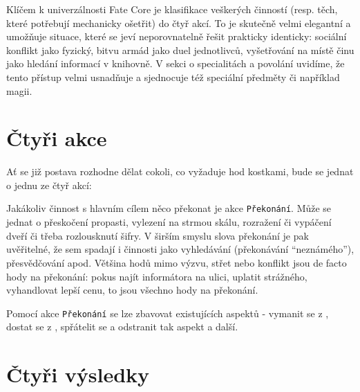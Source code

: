 \documentclass[../main.tex]{subfiles}
\begin{document}
Klíčem k univerzálnosti Fate Core je klasifikace veškerých činností (resp. těch, které potřebují mechanicky ošetřit) do čtyř akcí. To je skutečně velmi elegantní a umožňuje situace, které se jeví neporovnatelně řešit prakticky identicky: sociální konflikt jako fyzický, bitvu armád jako duel jednotlivců, vyšetřování na místě činu jako hledání informací v knihovně. V sekci o specialitách a povolání uvidíme, že tento přístup velmi usnadňuje a sjednocuje též speciální předměty či například magii.

\section{Čtyři akce}
\label{sec:4-akce}

Ať se již postava rozhodne dělat cokoli, co vyžaduje hod kostkami, bude se jednat o jednu ze čtyř akcí:

\begin{akce}
   Jakákoliv činnost s hlavním cílem něco překonat je akce \texttt{Překonání}. Může se jednat o přeskočení propasti, vylezení na strmou skálu, rozražení či vypáčení dveří či třeba rozlousknutí šifry. V širším smyslu slova překonání je pak uvěřitelné, že sem spadají i činnosti jako vyhledávání (překonávání ``neznámého''), přesvědčování apod. Většina hodů mimo výzvu, střet nebo konflikt jsou de facto hody na překonání: pokus najít informátora na ulici, uplatit strážného, vyhandlovat lepší cenu, to jsou všechno hody na překonání.

  Pomocí akce \texttt{Překonání} se lze zbavovat existujících aspektů - vymanit se z , dostat se z , spřátelit se a odstranit tak aspekt  a další.
\end{akce}



\section{Čtyři výsledky}
\label{sec:4-vysledky}
\end{document}
